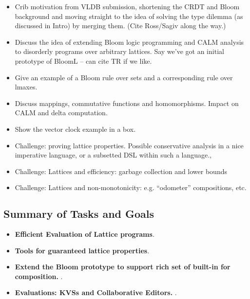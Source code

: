 \begin{itemize}
\item Crib motivation from VLDB submission, shortening the CRDT and Bloom background and moving straight to the idea of solving the type dilemma (as discussed in Intro) by merging them. (Cite Ross/Sagiv along the way.)
\item Discuss the idea of extending Bloom logic programming and CALM analysis to disorderly programs over arbitrary lattices. Say we've got an initial prototype of BloomL -- can cite TR if we like.
\item Give an example of a Bloom rule over sets and a corresponding rule over lmaxes.  
\item Discuss mappings, commutative functions and homomorphisms.  Impact on CALM and delta computation.
\item Show the vector clock example in a box.
\item Challenge: proving lattice properties. Possible conservative analysis in a nice imperative language, or a subsetted DSL within such a language., 
\item Challenge: Lattices and efficiency: garbage collection and lower bounds
\item Challenge: Lattices and non-monotonicity: e.g. ``odometer'' compositions, etc.
\end{itemize}

\subsection{Summary of Tasks and Goals}
\begin{itemize}
\item \textbf{Efficient Evaluation of Lattice programs}.  
\item \textbf{Tools for guaranteed lattice properties}.  
\item \textbf{Extend the Bloom prototype to support rich set of built-in for composition.}  .
\item \textbf{Evaluations: KVSs and Collaborative Editors.}  .
\end{itemize}